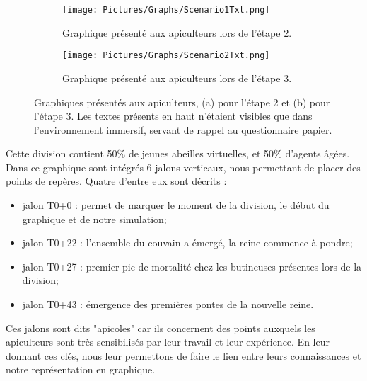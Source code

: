 		
		\begin{figure}
			\centering
		
			\begin{subfigure}{\textwidth}
			\centering
			\texttt{[image: Pictures/Graphs/Scenario1Txt.png]}
			\caption{Graphique présenté aux apiculteurs lors de l'étape 2.}
			\label{sc1Txt}	
			\end{subfigure}
			
			\begin{subfigure}{\textwidth}
			\centering
			\texttt{[image: Pictures/Graphs/Scenario2Txt.png]}
			\caption{Graphique présenté aux apiculteurs lors de l'étape 3.}
			\label{sc2Txt}
			\end{subfigure}
			
		\caption[Graphiques présentés aux apiculteurs pendant l'expérimentation]{Graphiques présentés aux apiculteurs, (a) pour l'étape  2 et (b) pour l'étape 3. Les textes présents en haut n'étaient visibles que dans l'environnement immersif, servant de rappel au questionnaire papier.}
		\label{scsTxt}
		\end{figure}
		
		Cette division contient 50\% de jeunes abeilles virtuelles, et 50\% d'agents âgées. Dans ce graphique sont intégrés 6 jalons verticaux, nous permettant de placer des points de repères. Quatre d'entre eux sont décrits :
		\begin{itemize}
			\item jalon T0+0 : permet de marquer le moment de la division, le début du graphique et de notre simulation;
			\item jalon T0+22 : l'ensemble du couvain a émergé, la reine commence à pondre;
			\item jalon T0+27 : premier pic de mortalité chez les butineuses présentes lors de la division;
			\item jalon T0+43 : émergence des premières pontes de la nouvelle reine.
		\end{itemize}
		Ces jalons sont dits "apicoles" car ils concernent des points auxquels les apiculteurs sont très sensibilisés par leur travail et leur expérience. En leur donnant ces clés, nous leur permettons de faire le lien entre leurs connaissances et notre représentation en graphique.
		
